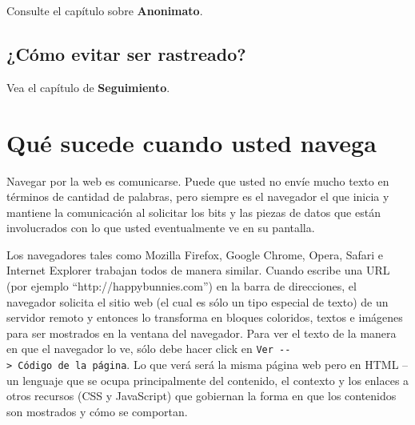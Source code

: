 \documentclass[10pt,a5paper,twoside,,]{book}
\begin{document}
Consulte el capítulo sobre \textbf{Anonimato}.

\section{¿Cómo evitar ser
rastreado?}\label{cuxf3mo-evitar-ser-rastreado}

Vea el capítulo de \textbf{Seguimiento}.

\chapter{Qué sucede cuando usted
navega}\label{quuxe9-sucede-cuando-usted-navega}

Navegar por la web es comunicarse. Puede que usted no envíe mucho texto
en términos de cantidad de palabras, pero siempre es el navegador el que
inicia y mantiene la comunicación al solicitar los bits y las piezas de
datos que están involucrados con lo que usted eventualmente ve en su
pantalla.

Los navegadores tales como Mozilla Firefox, Google Chrome, Opera, Safari
e Internet Explorer trabajan todos de manera similar. Cuando escribe una
URL (por ejemplo ``http://happybunnies.com'') en la barra de
direcciones, el navegador solicita el sitio web (el cual es sólo un tipo
especial de texto) de un servidor remoto y entonces lo transforma en
bloques coloridos, textos e imágenes para ser mostrados en la ventana
del navegador. Para ver el texto de la manera en que el navegador lo ve,
sólo debe hacer click en
\texttt{Ver\ -\/-\textgreater{}\ Código\ de\ la\ página}. Lo que verá
será la misma página web pero en HTML -- un lenguaje que se ocupa
principalmente del contenido, el contexto y los enlaces a otros recursos
(CSS y JavaScript) que gobiernan la forma en que los contenidos son
mostrados y cómo se comportan.
\end{document}
